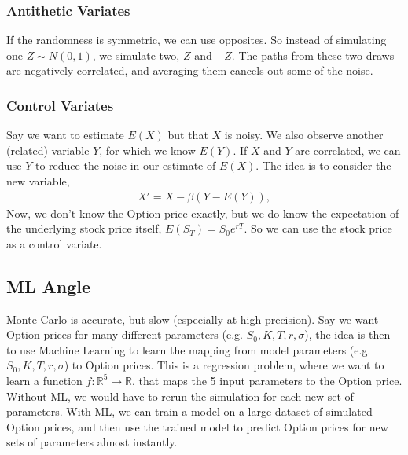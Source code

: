 \subsubsection{Antithetic Variates}
If the randomness is symmetric, we can use opposites. So instead of simulating one $Z \sim N(0,1)$, we simulate two, $Z$ and $-Z$. The paths from these two draws are negatively correlated, and averaging them cancels out some of the noise. 

\subsubsection{Control Variates}
Say we want to estimate $E(X)$ but that $X$ is noisy. We also observe another (related) variable $Y$, for which we know $E(Y)$. If $X$ and $Y$ are correlated, we can use $Y$ to reduce the noise in our estimate of $E(X)$. The idea is to consider the new variable,
\begin{align*}
    X' = X - \beta(Y - E(Y)),
\end{align*}
Now, we don't know the Option price exactly, but we do know the expectation of the underlying stock price itself, $E(S_T) = S_0 e^{rT}$. So we can use the stock price as a control variate.   

\subsection{ML Angle}

Monte Carlo is accurate, but slow (especially at high precision). Say we want Option prices for many different parameters (e.g. $S_0, K, T, r, \sigma$), the idea is then to use Machine Learning to learn the mapping from model parameters (e.g. $S_0, K, T, r, \sigma$) to Option prices. This is a regression problem, where we want to learn a function $f: \mathbb{R}^5 \to \mathbb{R}$, that maps the 5 input parameters to the Option price. Without ML, we would have to rerun the simulation for each new set of parameters. With ML, we can train a model on a large dataset of simulated Option prices, and then use the trained model to predict Option prices for new sets of parameters almost instantly. 